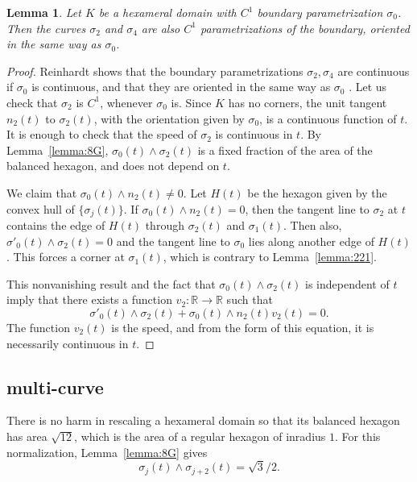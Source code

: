 \documentclass[11pt]{amsart}
\newtheorem{lemma}[equation]{Lemma}
\newcommand{\ring}[1]{\mathbb{#1}}
\begin{document}
\begin{lemma}\label{lemma:sigma2:c1} 
Let $K$ be a hexameral domain with $C^1$ boundary
parametrization $\sigma_0$.  Then the curves $\sigma_2$ and $\sigma_4$
are also $C^1$ parametrizations of the boundary, oriented in the same
way as $\sigma_0$.
\end{lemma}

\begin{proof} Reinhardt shows that the boundary parametrizations
  $\sigma_2,\sigma_4$ are continuous if $\sigma_0$ is continuous, and
  that they are oriented in the same way as $\sigma_0$
  \cite[p.222]{R}.  Let us check that $\sigma_2$ is $C^1$, whenever
  $\sigma_0$ is.  Since $K$ has no corners, the unit tangent $n_2(t)$
  to $\sigma_2(t)$, with the orientation given by $\sigma_0$, is a
  continuous function of $t$.  It is enough to check that the speed of
  $\sigma_2$ is continuous in $t$.  By  Lemma~\ref{lemma:8G},
  ${\sigma_0(t)}\land{\sigma_2(t)}$ is a fixed fraction of the area of
  the balanced hexagon, and does not depend on $t$.

  We claim that ${\sigma_0(t)}\land{n_2(t)}\ne 0$.  Let $H(t)$ be the
  hexagon given by the convex hull of $\{\sigma_j(t)\}$.  If
  ${\sigma_0(t)}\land{n_2(t)}=0$, then the tangent line to $\sigma_2$
  at $t$ contains the edge of $H(t)$ through $\sigma_2(t)$ and
  $\sigma_1(t)$.  Then also, ${\sigma'_0(t)}\land{\sigma_2(t)}=0$ and
  the tangent line to $\sigma_0$ lies along another edge of $H(t)$.
  This forces a corner at $\sigma_1(t)$, which is contrary to Lemma~\ref{lemma:221}.

This nonvanishing result and the fact that ${\sigma_0(t)}\land{\sigma_2(t)}$ 
is independent of $t$ imply that there exists a function
$v_2:\ring{R}\to\ring{R}$ such that 
  \begin{equation}\label{eqn:sB}
  {\sigma'_0(t)}\land{\sigma_2(t)} + {\sigma_0(t)}\land{n_2(t)} v_2(t) = 0.
  \end{equation}
The function $v_2(t)$ is the speed, and from the form of this equation,
it is necessarily continuous in $t$.
\end{proof}



\subsection{multi-curve}

There is no harm in rescaling a hexameral domain so that its balanced
hexagon has area $\sqrt{12}$, which is the area of a regular hexagon
of inradius $1$.  For this normalization, Lemma~\ref{lemma:8G} gives
 \begin{equation}\label{eqn:AB}
 {\sigma_j(t)}\land{\sigma_{j+2}(t)} = \sqrt{3}/2.
 \end{equation}
\end{document}
